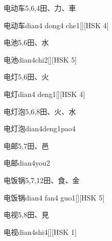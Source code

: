\begin{entry}{电动车}{5,6,4}{⽥、⼒、⾞}
  \begin{phonetics}{电动车}{dian4 dong4 che1}[][HSK 4]
  \end{phonetics}
\end{entry}

\begin{entry}{电池}{5,6}{⽥、⽔}
  \begin{phonetics}{电池}{dian4chi2}[][HSK 5]
  \end{phonetics}
\end{entry}

\begin{entry}{电灯}{5,6}{⽥、⽕}
  \begin{phonetics}{电灯}{dian4 deng1}[][HSK 4]
  \end{phonetics}
\end{entry}

\begin{entry}{电灯泡}{5,6,8}{⽥、⽕、⽔}
  \begin{phonetics}{电灯泡}{dian4deng1pao4}
  \end{phonetics}
\end{entry}

\begin{entry}{电邮}{5,7}{⽥、⾢}
  \begin{phonetics}{电邮}{dian4you2}
  \end{phonetics}
\end{entry}

\begin{entry}{电饭锅}{5,7,12}{⽥、⾷、⾦}
  \begin{phonetics}{电饭锅}{dian4 fan4 guo1}[][HSK 5]
  \end{phonetics}
\end{entry}

\begin{entry}{电视}{5,8}{⽥、⾒}
  \begin{phonetics}{电视}{dian4shi4}[][HSK 1]
  \end{phonetics}
\end{entry}

